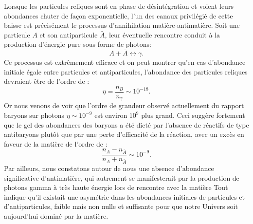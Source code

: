 Lorsque les particules reliques sont en phase de désintégration et voient leurs abondances chuter de façon exponentielle, l'un des canaux privilégié de cette baisse est précisément le processus d'annihilation matière-antimatière. Soit une particule $A$ et son antiparticule $\bar A$, leur éventuelle rencontre conduit à la production d'énergie pure sous forme de photons:
\begin{equation}
A+ \bar A \leftrightarrow \gamma.
\end{equation}
 Ce processus est extrêmement efficace et on peut montrer qu'en cas d'abondance initiale égale entre particules et antiparticules, l'abondance des particules reliques devraient être de l'ordre de :
 \begin{equation}
 \eta=\frac{n_B}{n_\gamma}\sim10^{-18}.
 \end{equation}
 Or nous venons de voir que l'ordre de grandeur observé actuellement du rapport baryons sur photons $\eta\sim10^{-9}$ est environ $10^9$ plus grand. Ceci suggère fortement que le gel des abondances des baryons a été dicté par l'absence de réactifs de type antibaryons plutôt que par une perte d'efficacité de la réaction, avec un excès en faveur de la matière de l'ordre de :
 \begin{equation}
 \frac{n_A-n_{\bar A}}{n_A+n_{\bar A}}\sim10^{-9}.
 \end{equation}
 Par ailleurs, nous constatons autour de nous une absence d'abondance significative d'antimatière, qui autrement se manifesterait par la production de photons gamma à très haute énergie lors de rencontre avec la matière  Tout indique qu'il existait une asymétrie dans les abondances initiales de particules et d'antiparticules, faible mais non nulle et suffisante pour que notre Univers soit aujourd'hui dominé par la matière.
 
